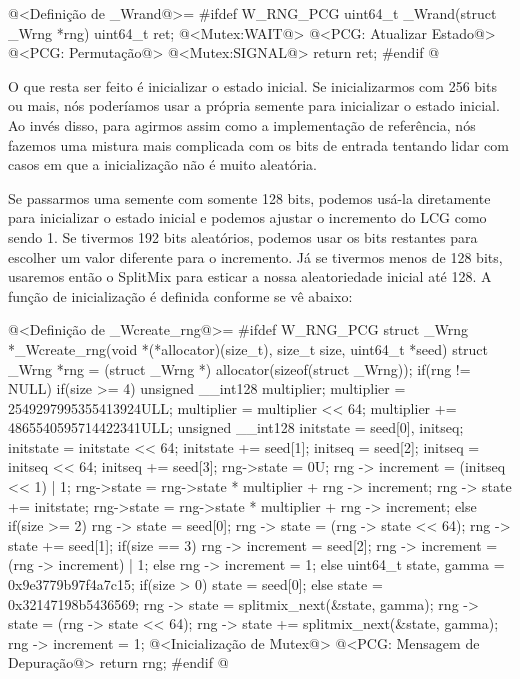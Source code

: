 \iniciocodigo
@<Definição de \_Wrand@>=
#ifdef W_RNG_PCG
uint64_t _Wrand(struct _Wrng *rng){
  uint64_t ret;
  @<Mutex:WAIT@>
  @<PCG: Atualizar Estado@>
  @<PCG: Permutação@>
  @<Mutex:SIGNAL@>
  return ret;
}
#endif
@
\fimcodigo

O que resta ser feito é inicializar o estado inicial. Se
inicializarmos com 256 bits ou mais, nós poderíamos usar a própria
semente para inicializar o estado inicial. Ao invés disso, para
agirmos assim como a implementação de referência, nós fazemos uma
mistura mais complicada com os bits de entrada tentando lidar com
casos em que a inicialização não é muito aleatória.


Se passarmos uma semente com somente 128 bits, podemos usá-la
diretamente para inicializar o estado inicial e podemos ajustar o
incremento do LCG como sendo 1. Se tivermos 192 bits aleatórios,
podemos usar os bits restantes para escolher um valor diferente para o
incremento. Já se tivermos menos de 128 bits, usaremos então o
SplitMix para esticar a nossa aleatoriedade inicial até 128. A função
de inicialização é definida conforme se vê abaixo:

\iniciocodigo
@<Definição de \_Wcreate\_rng@>=
#ifdef W_RNG_PCG
struct _Wrng *_Wcreate_rng(void *(*allocator)(size_t), size_t size,
                           uint64_t *seed){
  struct _Wrng *rng = (struct _Wrng *) allocator(sizeof(struct _Wrng));
  if(rng != NULL){
    if(size >= 4){
      unsigned __int128 multiplier;
      multiplier = 2549297995355413924ULL;
      multiplier = multiplier << 64;
      multiplier += 4865540595714422341ULL;
      unsigned __int128 initstate = seed[0], initseq;
      initstate = initstate << 64;
      initstate += seed[1];
      initseq = seed[2];
      initseq = initseq << 64;
      initseq += seed[3];
      rng->state = 0U;
      rng -> increment = (initseq << 1) | 1;
      rng->state = rng->state * multiplier + rng -> increment;
      rng -> state += initstate;
      rng->state = rng->state * multiplier + rng -> increment;
    }
    else if(size >= 2){
      rng -> state = seed[0];
      rng -> state = (rng -> state << 64);
      rng -> state += seed[1];
      if(size == 3){
        rng -> increment = seed[2];
        rng -> increment = (rng -> increment) | 1;
      }
      else
        rng -> increment = 1;
    }
    else{
      uint64_t state, gamma = 0x9e3779b97f4a7c15;
      if(size > 0)
        state = seed[0];
      else
        state = 0x32147198b5436569;
      rng -> state = splitmix_next(&state, gamma);
      rng -> state = (rng -> state << 64);
      rng -> state += splitmix_next(&state, gamma);
      rng -> increment = 1;
    }
    @<Inicialização de Mutex@>
    @<PCG: Mensagem de Depuração@>
  }
  return rng;
}
#endif
@
\fimcodigo

